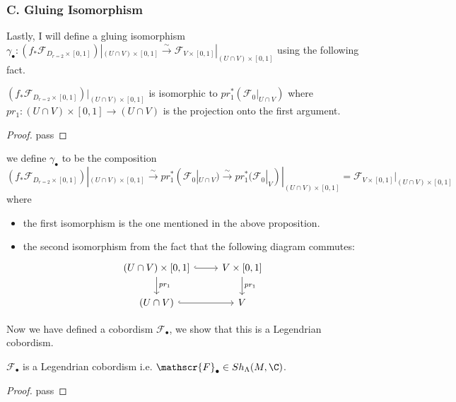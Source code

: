 \subsubsection{C. Gluing Isomorphism}
Lastly, I will define a gluing isomorphism $\gamma_\bullet : (f_*\mathscr{F}_{D_{r=2}\times [0,1]})|_{(U\cap V)\times [0,1]} \xrightarrow{\sim} \mathscr{F}_{V\times [0,1]}|_{(U\cap V)\times [0,1]}$ using the following fact.
\begin{proposition}
$(f_*\mathscr{F}_{D_{r=2}\times [0,1]})|_{(U\cap V)\times[0,1]}$ is isomorphic to $pr_1^*(\mathscr{F}_0|_{U\cap V})$ where $pr_1 : (U\cap V) \times [0,1] \rightarrow (U\cap V)$ is the projection onto the first argument.
\end{proposition}
\begin{proof}
pass
\end{proof}
\begin{definition}
we define $\gamma_\bullet$ to be the composition 
\[
(f_*\mathscr{F}_{D_{r=2}\times [0,1]})|_{(U\cap V)\times [0,1]}\xrightarrow{\sim}pr_1^*(\mathscr{F}_0|_{U\cap V})\xrightarrow{\sim}pr_1^*(\mathscr{F}_0|_{V})|_{(U\cap V)\times [0,1]}=\mathscr{F}_{V\times [0,1]}|_{(U\cap V)\times [0,1]}
\]
where
\begin{itemize}
\item the first isomorphism is the one mentioned in the above proposition.

\item the second isomorphism from the fact that the following diagram commutes:
\[
\begin{tikzcd}
(U\cap V)\times [0,1] \arrow[hookrightarrow]{r}\arrow[d, "pr_1"]     & V\times [0,1] \arrow[d, "pr_1"] \\
(U\cap V) \arrow[hookrightarrow]{r} & V 
\end{tikzcd}
\]
\end{itemize}
\end{definition}

Now we have defined a cobordism $\mathscr{F}_\bullet$, we show that this is a Legendrian cobordism.
\begin{proposition}
$\mathscr{F}_\bullet$ is a Legendrian cobordism i.e. $\mathscr{F}_\bullet \in Sh_\Lambda(M,\C)$.
\end{proposition}
\begin{proof}
pass
\end{proof}

